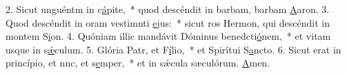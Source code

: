 2. Sicut unguéntm in c\uline{á}pite,~* quod descéndit in barbam, barbam \uline{A}aron.
3. Quod descéndit in oram vestimnti \uline{e}jus:~* sicut ros Hermon, qui descéndit in montem S\uline{i}on.
4. Quóniam illic mandávit Dóminus benedcti\uline{ó}nem,~* et vitam usque in s\uline{ǽ}culum.
5. Glória Patr, et F\uline{í}lio,~* et Spirítui S\uline{a}ncto.
6. Sicut erat in princípio, et nnc, et s\uline{e}mper,~* et in sǽcula sæculórum. \uline{A}men.
